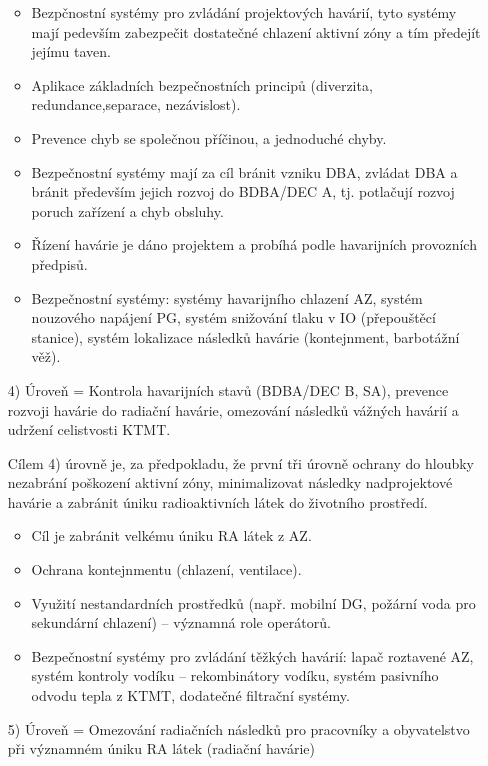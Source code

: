 \begin{itemize}
        \begin{itemize}
            \item Bezpčnostní systémy pro zvládání projektových havárií, tyto systémy mají pedevším zabezpečit dostatečné chlazení aktivní zóny a tím předejít jejímu taven.
            \item Aplikace základních bezpečnostních principů (diverzita, redundance,separace, nezávislost).
            \item Prevence chyb se společnou příčinou, a jednoduché chyby.
            \item Bezpečnostní systémy mají za cíl bránit vzniku DBA, zvládat DBA a bránit především jejich rozvoj do BDBA/DEC A, tj. potlačují rozvoj poruch zařízení a chyb obsluhy.
            \item Řízení havárie je dáno projektem a probíhá podle havarijních provozních předpisů.
            \item Bezpečnostní systémy: systémy havarijního chlazení AZ, systém nouzového napájení PG, systém snižování tlaku v IO (přepouštěcí stanice), systém lokalizace následků havárie (kontejnment, barbotážní věž).
        \end{itemize}

    \item[4)] Úroveň = Kontrola havarijních stavů (BDBA/DEC B, SA), prevence rozvoji havárie do radiační havárie, omezování následků vážných havárií a udržení celistvosti KTMT.
        
    Cílem 4) úrovně je, za předpokladu, že první tři úrovně ochrany do hloubky nezabrání poškození aktivní zóny, minimalizovat následky nadprojektové havárie a zabránit úniku radioaktivních látek do životního prostředí. 

        \begin{itemize}
            \item Cíl je zabránit velkému úniku RA látek z AZ.
            \item Ochrana kontejnmentu (chlazení, ventilace).
            \item Využití nestandardních prostředků (např. mobilní DG, požární voda pro sekundární chlazení) -- významná role operátorů.
            \item Bezpečnostní systémy pro zvládání těžkých havárií: lapač roztavené AZ, systém kontroly vodíku -- rekombinátory vodíku, systém pasivního odvodu tepla z KTMT, dodatečné filtrační systémy.           
        \end{itemize}

    \item[5)] Úroveň =  Omezování radiačních následků pro pracovníky a obyvatelstvo při významném úniku RA látek (radiační havárie)


\end{itemize}
